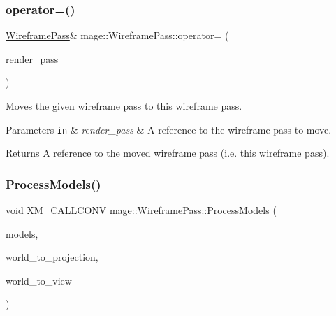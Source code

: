 \subsubsection{\texorpdfstring{operator=()}{operator=()}\hspace{0.1cm}{\footnotesize\ttfamily [2/2]}}
{\footnotesize\ttfamily \hyperlink{classmage_1_1_wireframe_pass}{Wireframe\+Pass}\& mage\+::\+Wireframe\+Pass\+::operator= (\begin{DoxyParamCaption}\item[{\hyperlink{classmage_1_1_wireframe_pass}{Wireframe\+Pass} \&\&}]{render\+\_\+pass }\end{DoxyParamCaption})\hspace{0.3cm}{\ttfamily [delete]}}

Moves the given wireframe pass to this wireframe pass.


\begin{DoxyParams}[1]{Parameters}
\mbox{\tt in}  & {\em render\+\_\+pass} & A reference to the wireframe pass to move. \\
\hline
\end{DoxyParams}
\begin{DoxyReturn}{Returns}
A reference to the moved wireframe pass (i.\+e. this wireframe pass). 
\end{DoxyReturn}
\hypertarget{classmage_1_1_wireframe_pass_a190f6a6a916949b6b37d5b70c9451008}{}\label{classmage_1_1_wireframe_pass_a190f6a6a916949b6b37d5b70c9451008} 
\subsubsection{\texorpdfstring{Process\+Models()}{ProcessModels()}}
{\footnotesize\ttfamily void X\+M\+\_\+\+C\+A\+L\+L\+C\+O\+NV mage\+::\+Wireframe\+Pass\+::\+Process\+Models (\begin{DoxyParamCaption}\item[{const vector$<$ const \hyperlink{classmage_1_1_model_node}{Model\+Node} $\ast$ $>$ \&}]{models,  }\item[{F\+X\+M\+M\+A\+T\+R\+IX}]{world\+\_\+to\+\_\+projection,  }\item[{C\+X\+M\+M\+A\+T\+R\+IX}]{world\+\_\+to\+\_\+view }\end{DoxyParamCaption})\hspace{0.3cm}{\ttfamily [private]}}

